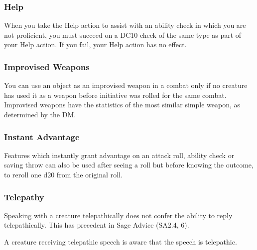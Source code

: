 \documentclass[letterpaper,twocolumn,openany,nodeprecatedcode]{dndbook}
\begin{document}
\subsubsection{Help}
When you take the Help action to assist with an ability check in which you are not proficient, you must succeed on a DC10 check of the same type as part of your Help action. If you fail, your Help action has no effect.

\subsubsection{Improvised Weapons}
You can use an object as an improvised weapon in a combat only if no creature has used it as a weapon before initiative was rolled for the same combat. Improvised weapons have the statistics of the most similar simple weapon, as determined by the DM.

\subsubsection{Instant Advantage}
Features which instantly grant advantage on an attack roll, ability check or saving throw can also be used after seeing a roll but before knowing the outcome, to reroll one d20 from the original roll.

\subsubsection{Telepathy}
Speaking with a creature telepathically does not confer the ability to reply telepathically. This has precedent in Sage Advice (SA2.4, 6).

A creature receiving telepathic speech is aware that the speech is telepathic.
\end{document}
